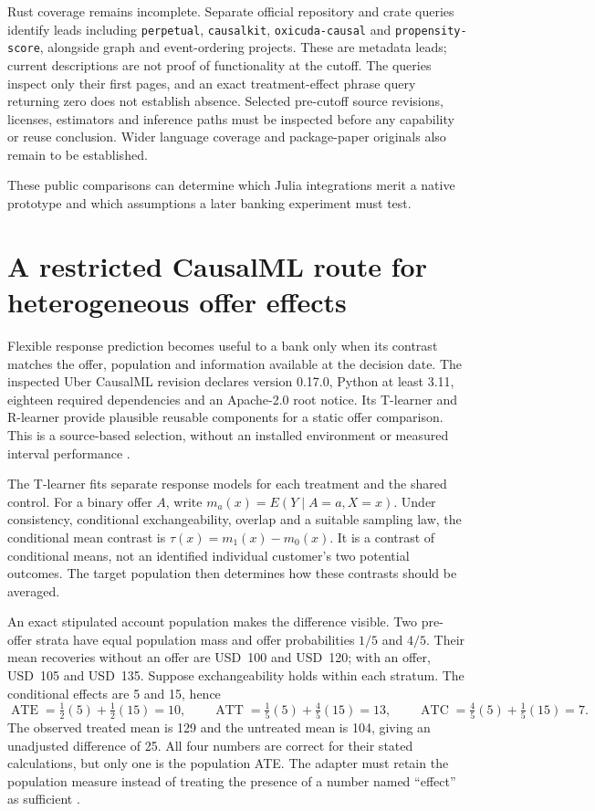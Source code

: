 Rust coverage remains incomplete. Separate official repository and crate
queries identify leads including \texttt{perpetual}, \texttt{causalkit},
\texttt{oxicuda-causal} and \texttt{propensity-score}, alongside graph and
event-ordering projects. These are metadata leads; current descriptions are
not proof of functionality at the cutoff. The queries inspect only their
first pages, and an exact treatment-effect phrase query returning zero does
not establish absence. Selected pre-cutoff source revisions, licenses,
estimators and inference paths must be inspected before any capability or
reuse conclusion. Wider language coverage and package-paper originals also
remain to be established. \citep{exec21_effects_discovery}

These public comparisons can determine which Julia integrations merit a
native prototype and which assumptions a later banking experiment must test.


\section{A restricted CausalML route for heterogeneous offer effects}
\label{exec14:causalml}

Flexible response prediction becomes useful to a bank only when its contrast
matches the offer, population and information available at the decision date.
The inspected Uber CausalML revision declares version 0.17.0, Python at least
3.11, eighteen required dependencies and an Apache-2.0 root notice. Its
T-learner and R-learner provide plausible reusable components for a static
offer comparison. This is a source-based selection, without an installed
environment or measured interval performance \citep{exec14_causalml_primary}.

The T-learner fits separate response models for each treatment and the shared
control. For a binary offer $A$, write
$m_a(x)=E(Y\mid A=a,X=x)$. Under consistency, conditional exchangeability,
overlap and a suitable sampling law, the conditional mean contrast is
$\tau(x)=m_1(x)-m_0(x)$. It is a contrast of conditional means, not an identified
individual customer's two potential outcomes. The target population then
determines how these contrasts should be averaged.

An exact stipulated account population makes the difference visible. Two
pre-offer strata have equal population mass and offer probabilities $1/5$
and $4/5$. Their mean recoveries without an offer are USD~100 and USD~120;
with an offer, USD~105 and USD~135. Suppose exchangeability holds within each
stratum. The conditional effects are 5 and 15, hence
\[
\operatorname{ATE}=\tfrac12(5)+\tfrac12(15)=10,\qquad
\operatorname{ATT}=\tfrac15(5)+\tfrac45(15)=13,\qquad
\operatorname{ATC}=\tfrac45(5)+\tfrac15(15)=7.
\]
The observed treated mean is 129 and the untreated mean is 104, giving an
unadjusted difference of 25. All four numbers are correct for their stated
calculations, but only one is the population ATE. The adapter must retain
the population measure instead of treating the presence of a number named
``effect'' as sufficient \citep{exec14_causalml_oracle}.


